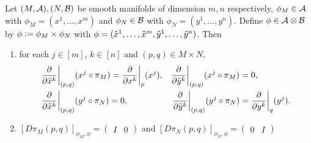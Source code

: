 \documentclass{book}
\begin{document}
	\begin{ex} 
		Let $(M, \mathcal{A}), (N, \mathcal{B})$ be smooth manifolds of dimension $m,n$ respectively, $\phi_M \in \mathcal{A}$ with $\phi_M = (x^1, \ldots, x^m)$ and $\phi_N \in \mathcal{B}$ with $\phi_N = (y^1, \ldots, y^n)$. Define $\phi \in \mathcal{A} \otimes \mathcal{B}$ by $\phi \vcentcolon= \phi_M \times \phi_N$ with $\phi = (\tilde{x}^1, \ldots, \tilde{x}^m, \tilde{y}^1, \ldots, \tilde{y}^n)$. Then 
		\begin{enumerate}
			\item for each $j \in [m]$, $k \in [n]$ and $(p,q) \in M \times N$,
			\begin{align*}
				& \frac{\partial }{\partial \tilde{x}^k} \bigg|_{(p,q)} ( x^j \circ \pi_M ) = \frac{\partial}{\partial x^k} \bigg|_p (x^j), 
				&\frac{\partial }{\partial \tilde{y}^k} \bigg|_{(p,q)} ( x^j \circ \pi_M ) &= 0, \\
				& \frac{\partial }{\partial \tilde{x}^k} \bigg|_{(p,q)} ( y^j \circ \pi_N ) = 0, 
				& \frac{\partial }{\partial \tilde{y}^k} \bigg|_{(p,q)} ( y^j \circ \pi_N ) &=  \frac{\partial}{\partial y^k} \bigg|_q (y^j).
			\end{align*}
			\item $[D \pi_M (p,q)]_{\phi_M, \phi} = 
			\begin{pmatrix}
				I & 0
			\end{pmatrix}$
			and 
			$[D \pi_N (p,q)]_{\phi_N, \phi} = 
			\begin{pmatrix}
				0 & I
			\end{pmatrix}$
		\end{enumerate}
	\end{ex}
	
\end{document}
